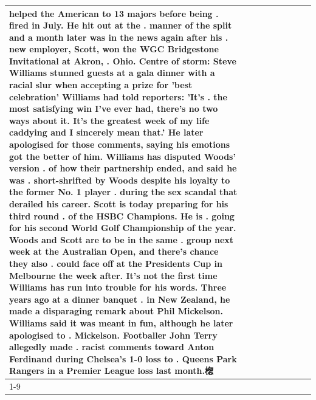 \begin{table}[H]
\begin{tabular}{lllrlllll}
helped the American to 13 majors before being . fired in July. He hit out at the . manner of the split and a month later was in the news again after his . new employer, Scott, won the WGC Bridgestone Invitational at Akron, . Ohio. Centre of storm: Steve Williams stunned guests at a gala dinner with a racial slur when accepting a prize for 'best celebration' Williams had told reporters: 'It's . the most satisfying win I've ever had, there's no two ways about it. It's the greatest week of my life caddying and I sincerely mean that.' He later apologised for those comments, saying his emotions got the better of him. Williams has disputed Woods' version . of how their partnership ended, and said he was . short-shrifted by Woods despite his loyalty to the former No. 1 player . during the sex scandal that derailed his career. Scott is today preparing for his third round . of the HSBC Champions. He is . going for his second World Golf Championship of the year. Woods and Scott are to be in the same . group next week at the Australian Open, and there's chance they also . could face off at the Presidents Cup in Melbourne the week after. It's not the first time Williams has run into trouble for his words. Three years ago at a dinner banquet . in New Zealand, he made a disparaging remark about Phil Mickelson. Williams said it was meant in fun, although he later apologised to . Mickelson. Footballer John Terry allegedly made . racist comments toward Anton Ferdinand during Chelsea's 1-0 loss to . Queens Park Rangers in a Premier League loss last month.楤 \\
\cline{1-9}

\end{tabular}
\end{table}
